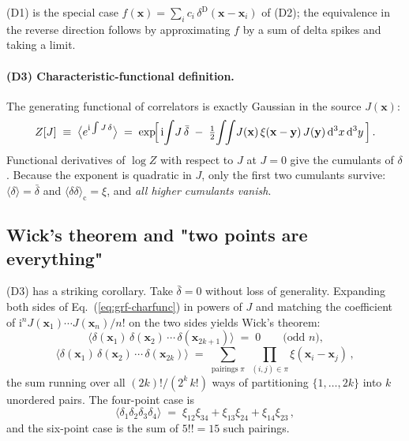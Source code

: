 \documentclass[12pt]{article}
\newcommand{\bx}{\mathbf{x}}
\newcommand{\by}{\mathbf{y}}
\begin{document}
(D1) is the special case $f(\bx) = \sum_i c_i\,\delta^\mathrm{D}(\bx - \bx_i)$
of (D2); the equivalence in the reverse direction follows by
approximating $f$ by a sum of delta spikes and taking a limit.

\paragraph{(D3) Characteristic-functional definition.}
The generating functional of correlators is exactly Gaussian in
the source $J(\bx)$:
\begin{equation}
  Z[J] \;\equiv\; \bigl\langle e^{\mathrm i \int J\,\delta}\bigr\rangle
  \;=\; \exp\!\Bigl[\,\mathrm i\!\int\! J\,\bar\delta
              \;-\; \tfrac12\!\int\!\!\int\! J(\bx)\,\xi(\bx-\by)\,
                                            J(\by)\,\mathrm d^3x\,\mathrm d^3y\,\Bigr]\,.
  \label{eq:grf-charfunc}
\end{equation}
Functional derivatives of $\log Z$ with respect to $J$ at $J=0$
give the cumulants of $\delta$.  Because the exponent is quadratic
in $J$, only the first two cumulants survive: $\langle\delta\rangle
= \bar\delta$ and $\langle\delta\delta\rangle_\mathrm{c} = \xi$,
and \emph{all higher cumulants vanish}.

\subsection{Wick's theorem and "two points are everything"}
\label{sec:grf-wick}

(D3) has a striking corollary.  Take $\bar\delta = 0$ without
loss of generality.  Expanding both sides of
Eq.~(\ref{eq:grf-charfunc}) in powers of $J$ and matching the
coefficient of $\mathrm i^n J(\bx_1)\cdots J(\bx_n)/n!$ on the two
sides yields Wick's theorem:
\begin{equation}
  \langle\delta(\bx_1)\,\delta(\bx_2)\,\cdots\,\delta(\bx_{2k+1})\rangle
  \;=\; 0
  \qquad \text{(odd $n$),}
  \label{eq:wick-odd}
\end{equation}
\begin{equation}
  \langle\delta(\bx_1)\,\delta(\bx_2)\,\cdots\,\delta(\bx_{2k})\rangle
  \;=\; \sum_{\text{pairings}\;\pi}\;
        \prod_{(i,j)\in\pi} \xi(\bx_i - \bx_j)\,,
  \label{eq:wick-even}
\end{equation}
the sum running over all $(2k)!/(2^k\,k!)$ ways of partitioning
$\{1,\dots,2k\}$ into $k$ unordered pairs.  The four-point case is
\begin{equation}
  \langle \delta_1\delta_2\delta_3\delta_4\rangle \;=\;
     \xi_{12}\xi_{34} + \xi_{13}\xi_{24} + \xi_{14}\xi_{23}\,,
  \label{eq:wick-4}
\end{equation}
and the six-point case is the sum of $5!! = 15$ such pairings.
\end{document}
